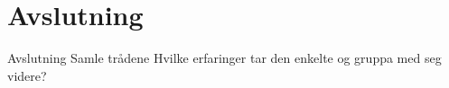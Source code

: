\section{Avslutning}
Avslutning
Samle trådene
Hvilke erfaringer tar den enkelte og gruppa med seg videre?
